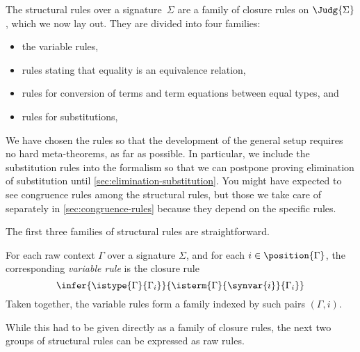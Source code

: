 The structural rules over a signature~$\Sigma$ are a family of closure rules on $\Judg{\Sigma}$, which we now lay out.
%
They are divided into four families:
%
\begin{itemize}
\item the variable rules,
\item rules stating that equality is an equivalence relation,
\item rules for conversion of terms and term equations between equal types, and
\item rules for substitutions,
\end{itemize}
%
We have chosen the rules so that the development of the general setup requires no hard meta-theorems, as far as possible. In particular, we include the substitution rules into the formalism so that we can postpone proving elimination of substitution until \cref{sec:elimination-substitution}. You might have expected to see congruence rules among the structural rules, but those we take care of separately in \cref{sec:congruence-rules} because they depend on the specific rules.

The first three families of structural rules are straightforward.

\begin{definition}
  \label{def:variable-rule}%
  For each raw context $\Gamma$ over a signature $\Sigma$, and for each $i \in \position{\Gamma}$, the corresponding \emph{variable rule} is the closure rule
  \begin{equation*}
    \infer{
      \istype{\Gamma}{\Gamma_i}
    }{
      \isterm{\Gamma}{\synvar{i}}{\Gamma_i}
    }
  \end{equation*}
  Taken together, the variable rules form a family indexed by such pairs $(\Gamma, i)$.
\end{definition}

While this had to be given directly as a family of closure rules, the next two groups of structural rules can be expressed as raw rules.

